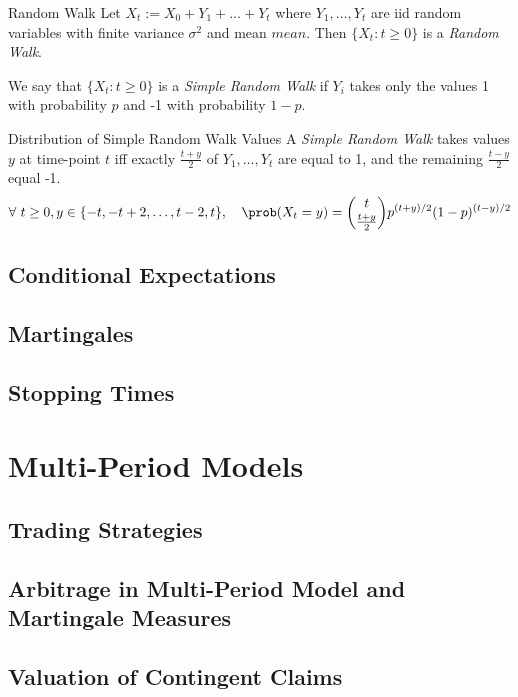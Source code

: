 \documentclass[11pt,a4paper]{article}
\begin{document}
  \begin{definition}{Random Walk}
    Let $X_t:=X_0+Y_1+\dots+Y_t$ where $Y_1,\dots,Y_t$ are iid random variables with finite variance $\sigma^2$ and mean $mean$. Then $\{X_t:t\geq0\}$ is a \textit{Random Walk}.
    \par We say that $\{X_t:t\geq0\}$ is a \textit{Simple Random Walk} if $Y_i$ takes only the values 1 with probability $p$ and -1 with probability $1-p$.
  \end{definition}

  \begin{proposition}{Distribution of Simple Random Walk Values}
    A \textit{Simple Random Walk} takes values $y$ at time-point $t$ iff exactly $\frac{t+y}2$ of $Y_1,\dots,Y_t$ are equal to 1, and the remaining $\frac{t-y}2$ equal -1.
    \[ \forall\ t\geq0,y\in\{-t,-t+2,\dots,t-2,t\},\quad\prob(X_t=y)={t\choose {\frac{t+y}2}}p^{(t+y)/2}(1-p)^{(t-y)/2} \]
  \end{proposition}

\subsection{Conditional Expectations}

\subsection{Martingales}

\subsection{Stopping Times}

\section{Multi-Period Models} \label{sec_multi_period_models}

\subsection{Trading Strategies}

\subsection{Arbitrage in Multi-Period Model and Martingale Measures}

\subsection{Valuation of Contingent Claims}
\end{document}
